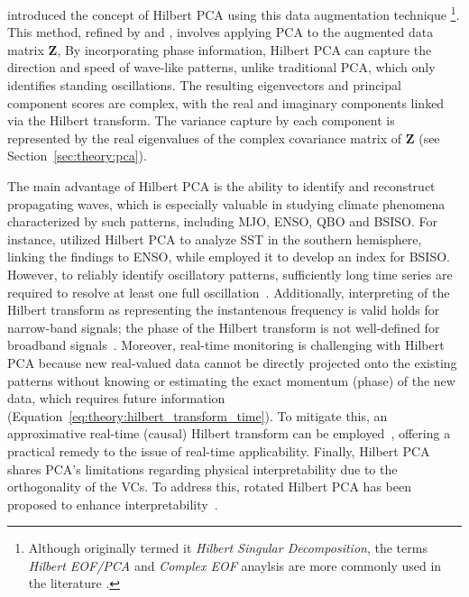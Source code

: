 \citet{rasmusson_biennial_1981} introduced the concept of Hilbert PCA using this data augmentation technique \footnote{Although \citet{rasmusson_biennial_1981} originally termed it \textit{Hilbert Singular Decomposition}, the terms \textit{Hilbert EOF/PCA} and \textit{Complex EOF} anaylsis are more commonly used in the literature \cite{jolliffe_principal_2002,storch_statistical_2003,hannachi_patterns_2021,burger_intraseasonal_2021}.}. This method, refined by \citet{barnett_interaction_1983} and \citet{horel_complex_1984}, involves applying PCA to the augmented data matrix $\bm{Z}$, By incorporating phase information, Hilbert PCA can capture the direction and speed of wave-like patterns, unlike traditional PCA, which only identifies standing oscillations. The resulting eigenvectors and principal component scores are complex, with the real and imaginary components linked via the Hilbert transform. The variance capture by each component is represented by the real eigenvalues of the complex covariance matrix of $\bm{Z}$ (see Section~\ref{sec:theory:pca}).

The main advantage of Hilbert PCA is the ability to identify and reconstruct propagating waves, which is especially valuable in studying climate phenomena characterized by such patterns, including MJO, ENSO, QBO and BSISO. For instance, \citet{cai_forcing_2001} utilized Hilbert PCA to analyze SST in the southern hemisphere, linking the findings to ENSO, while \citet{burger_intraseasonal_2021} employed it to develop an index for BSISO. However, to reliably identify oscillatory patterns, sufficiently long time series are required to resolve at least one full oscillation~\cite{merrifield_detecting_1990}. Additionally, interpreting of the Hilbert transform as representing the instantenous frequency is valid holds for narrow-band signals; the phase of the Hilbert transform is not well-defined for broadband signals~\cite{gabor_theory_1946,boashash_estimating_1992}. Moreover, real-time monitoring is challenging with Hilbert PCA because new real-valued data cannot be directly projected onto the existing patterns without knowing or estimating the exact momentum (phase) of the new data, which requires future information (Equation~\eqref{eq:theory:hilbert_transform_time}). To mitigate this, an approximative real-time (causal) Hilbert transform can be employed~\cite{burger_complex_1993,burger_intraseasonal_2021}, offering a practical remedy to the issue of real-time applicability. Finally, Hilbert PCA shares PCA's limitations regarding physical interpretability due to the orthogonality of the VCs. To address this, rotated Hilbert PCA has been proposed to enhance interpretability~\cite{horel_rotated_1981,bloomfield_orthogonal_1994}. 

